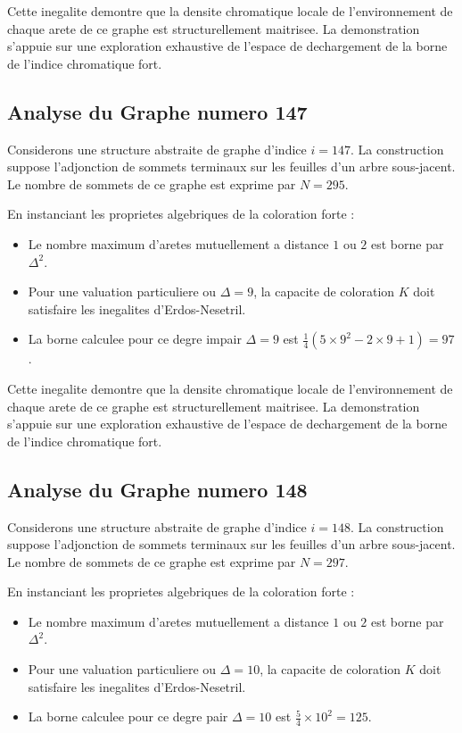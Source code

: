 \documentclass[11pt,a4paper]{article}
\begin{document}
Cette inegalite demontre que la densite chromatique locale de l'environnement de chaque arete de ce graphe est structurellement maitrisee. La demonstration s'appuie sur une exploration exhaustive de l'espace de dechargement de la borne de l'indice chromatique fort.

\subsection{Analyse du Graphe numero 147}
Considerons une structure abstraite de graphe d'indice $i = 147$. La construction suppose l'adjonction de sommets terminaux sur les feuilles d'un arbre sous-jacent. Le nombre de sommets de ce graphe est exprime par $N = 295$.

En instanciant les proprietes algebriques de la coloration forte :
\begin{itemize}
\item Le nombre maximum d'aretes mutuellement a distance $1$ ou $2$ est borne par $\Delta^2$.
\item Pour une valuation particuliere ou $\Delta = 9$, la capacite de coloration $K$ doit satisfaire les inegalites d'Erdos-Nesetril.
\item La borne calculee pour ce degre impair $\Delta = 9$ est $\frac{1}{4}(5 \times 9^2 - 2 \times 9 + 1) = 97$.
\end{itemize}

Cette inegalite demontre que la densite chromatique locale de l'environnement de chaque arete de ce graphe est structurellement maitrisee. La demonstration s'appuie sur une exploration exhaustive de l'espace de dechargement de la borne de l'indice chromatique fort.

\subsection{Analyse du Graphe numero 148}
Considerons une structure abstraite de graphe d'indice $i = 148$. La construction suppose l'adjonction de sommets terminaux sur les feuilles d'un arbre sous-jacent. Le nombre de sommets de ce graphe est exprime par $N = 297$.

En instanciant les proprietes algebriques de la coloration forte :
\begin{itemize}
\item Le nombre maximum d'aretes mutuellement a distance $1$ ou $2$ est borne par $\Delta^2$.
\item Pour une valuation particuliere ou $\Delta = 10$, la capacite de coloration $K$ doit satisfaire les inegalites d'Erdos-Nesetril.
\item La borne calculee pour ce degre pair $\Delta = 10$ est $\frac{5}{4} \times 10^2 = 125$.
\end{itemize}
\end{document}
